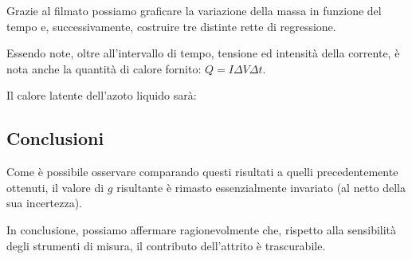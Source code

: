 \documentclass{article}
\begin{document}
Grazie al filmato possiamo graficare la variazione della massa in funzione del tempo
e, successivamente, costruire tre distinte rette di regressione.

Essendo note, oltre all'intervallo di tempo, tensione ed intensità della corrente,
è nota anche la quantità di calore fornito: $Q = I \Delta V \Delta t$.

Il calore latente dell'azoto liquido sarà:

\subsection{Conclusioni}

Come è possibile osservare comparando questi risultati a
quelli precedentemente ottenuti, il valore di $g$ risultante
è rimasto essenzialmente invariato (al netto della sua incertezza).

In conclusione, possiamo affermare ragionevolmente che,
rispetto alla sensibilità degli strumenti di misura,
il contributo dell'attrito è trascurabile.
\end{document}
